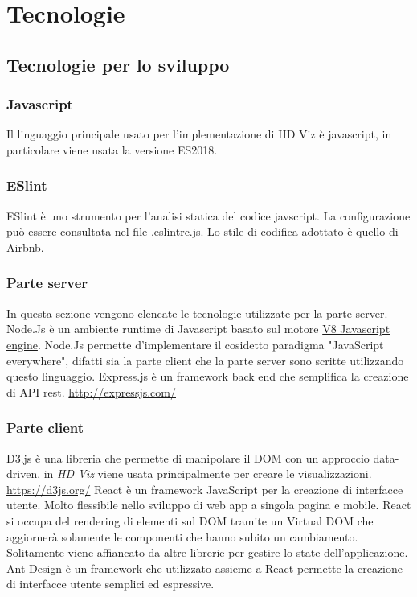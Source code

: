 \section{Tecnologie}
    \subsection{Tecnologie per lo sviluppo}
    \subsubsection{Javascript}
        Il linguaggio principale usato per l'implementazione di HD Viz è javascript, in particolare viene usata la versione ES2018.
    \subsubsection{ESlint}
        ESlint è uno strumento per l'analisi statica del codice javscript. La configurazione può essere consultata nel file .eslintrc.js. Lo stile di codifica adottato è quello di Airbnb.
    \subsubsection{Parte server}
    In questa sezione vengono elencate le tecnologie utilizzate per la parte server.
        Node.Js è un ambiente runtime di Javascript basato sul motore \href{https://v8.dev/}{V8 Javascript engine}. Node.Js permette d'implementare il cosidetto paradigma "JavaScript everywhere", difatti sia la parte client che la parte server sono scritte utilizzando questo linguaggio.
        Express.js è un framework back end che semplifica la creazione di API rest.
        \href{http://expressjs.com/}{http://expressjs.com/}
    \subsubsection{Parte client}
        D3.js è una libreria che permette di manipolare il DOM con un approccio data-driven, in \textit{HD Viz} viene usata principalmente per creare le visualizzazioni.
        \href{https://d3js.org/}{https://d3js.org/}
        React è un framework JavaScript per la creazione di interfacce utente. Molto flessibile nello sviluppo di web app a singola pagina e mobile. React si occupa del rendering di elementi sul DOM tramite un Virtual DOM che aggiornerà  solamente le componenti che hanno subito un cambiamento. Solitamente viene affiancato da altre librerie per gestire lo state dell'applicazione.
        Ant Design è un framework che utilizzato assieme a React permette la creazione di interfacce utente semplici ed espressive.
